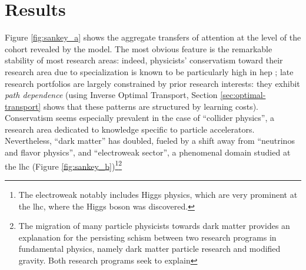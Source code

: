 \documentclass{article}
\begin{document}
 \section{\label{sec:results}Results}


Figure \ref{fig:sankey_a} shows the aggregate transfers of attention at the level of the cohort revealed by the model. %
The most obvious feature is the remarkable stability of most research areas: indeed, physicists' conservatism toward their research area due to specialization is known to be particularly high in \gls{hep} \citep{Aleta2019}; late research portfolios are largely constrained by prior research interests: they exhibit \textit{path dependence} \citep{Galesic2023} (using Inverse Optimal Transport, Section \ref{sec:optimal-transport} shows that these patterns are structured by learning costs). Conservatism seems especially prevalent in the case of ``collider physics'', a research area dedicated to knowledge specific to particle accelerators. Nevertheless, ``dark matter'' has doubled, fueled by a shift away from ``neutrinos and flavor physics'', and ``electroweak sector'', a phenomenal domain studied at the \gls{lhc} (Figure \ref{fig:sankey_b})\footnote{The electroweak notably includes Higgs physics, which are very prominent at the \gls{lhc}, where the Higgs boson was discovered.}\footnote{The migration of many particle physicists towards dark matter provides an explanation for the persisting schism between two research programs in fundamental physics, namely dark matter particle research and modified gravity. Both research programs seek to explain 
}
\end{document}

